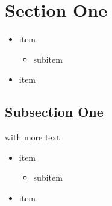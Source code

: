 \section{Section One}
\begin{frame}[fragile]{\insertsection}{}
  \begin{itemize}
    \item item
    \begin{itemize}
      \item subitem
    \end{itemize}
    \item item
  \end{itemize}
\end{frame}

\subsection{Subsection One}
\begin{frame}[fragile]{\insertsection with more text}{\insertsubsection}
  \begin{itemize}
    \item item
    \begin{itemize}
      \item subitem
    \end{itemize}
    \item item
  \end{itemize}
\end{frame}
